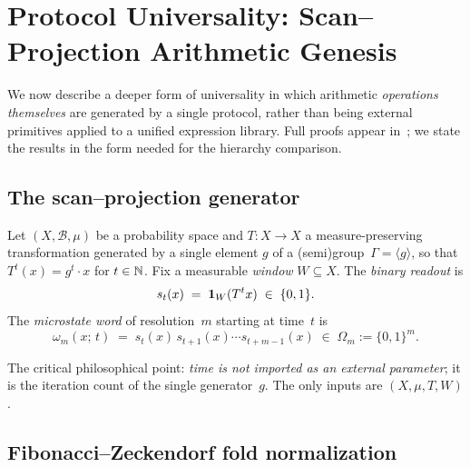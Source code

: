\section{Protocol Universality: Scan--Projection Arithmetic
  Genesis}\label{sec:L1}

We now describe a deeper form of universality in which arithmetic
\emph{operations themselves} are generated by a single protocol,
rather than being external primitives applied to a unified
expression library.  Full proofs appear
in~\cite{OmegaSPG2026}; we state the results in the form needed
for the hierarchy comparison.

\subsection{The scan--projection generator}\label{ssec:spg}

\begin{definition}
\label{def:spg}
Let $(X, \mathcal{B}, \mu)$ be a probability space and
$T \colon X \to X$ a measure-preserving transformation generated
by a single element $g$ of a (semi)group~$\Gamma = \langle g
\rangle$, so that $T^{t}(x) = g^{t} \cdot x$ for $t \in \mathbb{N}$.
Fix a measurable \emph{window} $W \subseteq X$.  The
\emph{binary readout} is
\[
  s_{t}(x) \;=\; \mathbf{1}_{W}(T^{t} x) \;\in\; \{0,1\}.
\]
The \emph{microstate word} of resolution~$m$ starting at time~$t$
is
\[
  \omega_{m}(x;\,t)
    \;=\; s_{t}(x)\, s_{t+1}(x) \cdots s_{t+m-1}(x)
    \;\in\; \Omega_{m} := \{0,1\}^{m}.
\]
\end{definition}

The critical philosophical point: \emph{time is not imported as an
external parameter}; it is the iteration count of the single
generator~$g$.  The only inputs are $(X,\mu,T,W)$.

\subsection{Fibonacci--Zeckendorf fold normalization}
\label{ssec:fold}

